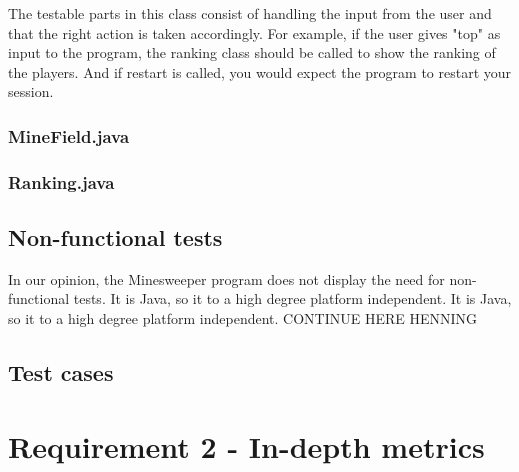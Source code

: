 \documentclass[UKenglish]{article}  %
\begin{document}
The testable parts in this class consist of handling the input from the user and that the right action is taken
accordingly. For example, if the user gives "top" as input to the program, the ranking class should be called to show
the ranking of the players. And if restart is called, you would expect the program to restart your session.
\subsubsection{MineField.java}

\subsubsection{Ranking.java}
\subsection{Non-functional tests}
In our opinion, the Minesweeper program does not display the need for non-functional tests. It is Java, so it to a high
degree platform independent. It is Java, so it to a high degree platform independent. CONTINUE HERE HENNING

\subsection{Test cases}

\section{Requirement 2 - In-depth metrics}
\end{document}
